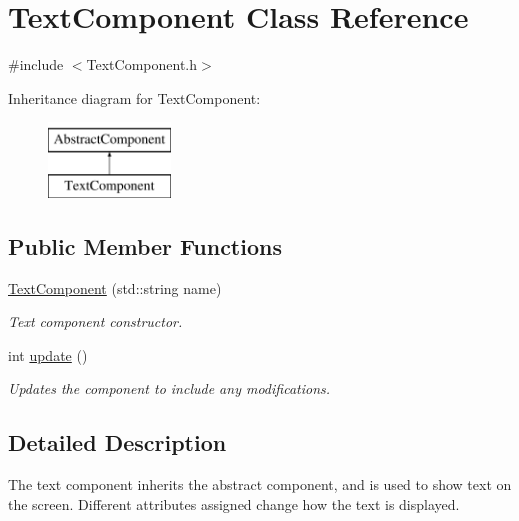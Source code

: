\hypertarget{class_text_component}{\section{Text\-Component Class Reference}
\label{d9/dde/class_text_component}
}


{\ttfamily \#include $<$Text\-Component.\-h$>$}

Inheritance diagram for Text\-Component\-:\begin{figure}[H]
\begin{center}
\leavevmode
\includegraphics[height=2.000000cm]{d9/dde/class_text_component}
\end{center}
\end{figure}
\subsection*{Public Member Functions}
\begin{DoxyCompactItemize}
\item 
\hyperlink{class_text_component_ac58d01b01cc22d742cc32822510f3585}{Text\-Component} (std\-::string name)
\begin{DoxyCompactList}\small\item\em Text component constructor. \end{DoxyCompactList}\item 
int \hyperlink{class_text_component_a0157702090c5ab75071448dfefb7196e}{update} ()
\begin{DoxyCompactList}\small\item\em Updates the component to include any modifications. \end{DoxyCompactList}\end{DoxyCompactItemize}


\subsection{Detailed Description}
The text component inherits the abstract component, and is used to show text on the screen. Different attributes assigned change how the text is displayed. 

